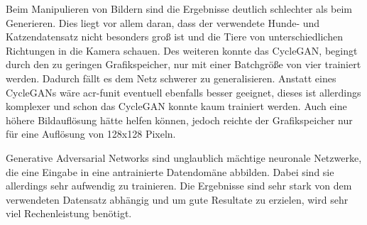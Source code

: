 Beim Manipulieren von Bildern sind die Ergebnisse deutlich schlechter als beim Generieren. 
Dies liegt vor allem daran, dass der verwendete Hunde- und Katzendatensatz nicht 
besonders groß ist und die Tiere von unterschiedlichen Richtungen in die Kamera schauen. 
Des weiteren konnte das CycleGAN, begingt durch den zu geringen Grafikspeicher, nur mit einer Batchgröße von vier 
trainiert werden. Dadurch fällt es dem Netz schwerer zu generalisieren. Anstatt eines 
CycleGANs wäre \gls{acr-funit} eventuell ebenfalls besser geeignet, dieses ist allerdings 
komplexer und schon das CycleGAN konnte kaum trainiert werden. Auch eine höhere 
Bildauflösung hätte helfen können, jedoch reichte der Grafikspeicher nur für eine 
Auflösung von 128x128 Pixeln.

Generative Adversarial Networks sind unglaublich mächtige neuronale Netzwerke, die eine Eingabe in eine 
antrainierte Datendomäne abbilden. Dabei sind sie allerdings sehr aufwendig zu trainieren.
Die Ergebnisse sind sehr stark von dem verwendeten Datensatz abhängig und um 
gute Resultate zu erzielen, wird sehr viel Rechenleistung benötigt.





